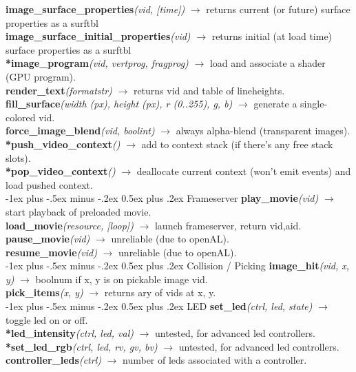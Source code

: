 \documentclass[10pt,landscape]{article}
\makeatletter
\renewcommand{\section}{\@startsection{section}{1}{0mm}%
                                {-1ex plus -.5ex minus -.2ex}%
                                {0.5ex plus .2ex}%
                                {\normalfont\large\bfseries}}
\makeatother
\begin{document}
\begin{multicols}{3}
	\textbf{image\_surface\_properties}\emph{(vid, [time])} $\rightarrow$ returns current (or future) surface properties as a surftbl\\
	\textbf{image\_surface\_initial\_properties}\emph{(vid)} $\rightarrow$ returns initial (at load time) surface properties as a surftbl\\
	\textbf{*image\_program}\emph{(vid, vertprog, fragprog)} $\rightarrow$ load and associate a shader (GPU program).\\
	\textbf{render\_text}\emph{(formatstr)} $\rightarrow$ returns vid and table of lineheights.\\
	\textbf{fill\_surface}\emph{(width (px), height (px), r (0..255), g, b)} $\rightarrow$ generate a single-colored vid.\\
	\textbf{force\_image\_blend}\emph{(vid, boolint)} $\rightarrow$ always alpha-blend (transparent images).\\
	\textbf{*push\_video\_context}\emph{()} $\rightarrow$ add to context stack (if there's any free stack slots).\\
	\textbf{*pop\_video\_context}\emph{()} $\rightarrow$ deallocate current context (won't emit events) and load pushed context.\\

\section{Frameserver}
	\textbf{play\_movie}\emph{(vid)} $\rightarrow$ start playback of preloaded movie.\\
	\textbf{load\_movie}\emph{(resource, [loop])} $\rightarrow$ launch frameserver, return vid,aid. \\
	\textbf{pause\_movie}\emph{(vid)} $\rightarrow$ unreliable (due to openAL). \\
	\textbf{resume\_movie}\emph{(vid)} $\rightarrow$ unreliable (due to openAL). \\
	
\section{Collision / Picking}
	\textbf{image\_hit}\emph{(vid, x, y)} $\rightarrow$ boolnum if x, y is on pickable image vid.\\
	\textbf{pick\_items}\emph{(x, y)} $\rightarrow$ returns ary of vids at x, y.\\

\section{LED}
	\textbf{set\_led}\emph{(ctrl, led, state)} $\rightarrow$ toggle led on or off.\\
	\textbf{*led\_intensity}\emph{(ctrl, led, val)} $\rightarrow$ untested, for advanced led controllers.\\
	\textbf{*set\_led\_rgb}\emph{(ctrl, led, rv, gv, bv)} $\rightarrow$ untested, for advanced led controllers.\\
	\textbf{controller\_leds}\emph{(ctrl)} $\rightarrow$ number of leds associated with a controller.\\


\end{multicols}
\end{document}
